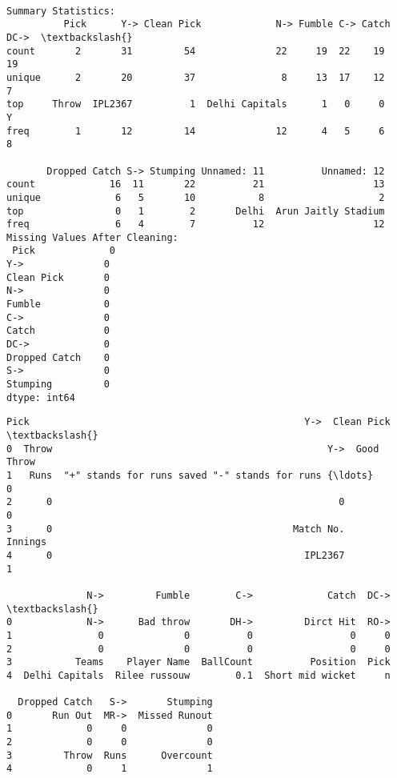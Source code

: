 \documentclass[11pt]{article}
\makeatletter
\newcommand{\boxspacing}{\kern\kvtcb@left@rule\kern\kvtcb@boxsep}
\newcommand{\prompt}[4]{
        {\ttfamily\llap{{\color{#2}[#3]:\hspace{3pt}#4}}\vspace{-\baselineskip}}
    }
\makeatother
\begin{document}
    \begin{Verbatim}[commandchars=\\\{\}]

Summary Statistics:
          Pick      Y-> Clean Pick             N-> Fumble C-> Catch DC->  \textbackslash{}
count       2       31         54              22     19  22    19   19
unique      2       20         37               8     13  17    12    7
top     Throw  IPL2367          1  Delhi Capitals      1   0     0    Y
freq        1       12         14              12      4   5     6    8

       Dropped Catch S-> Stumping Unnamed: 11          Unnamed: 12
count             16  11       22          21                   13
unique             6   5       10           8                    2
top                0   1        2       Delhi  Arun Jaitly Stadium
freq               6   4        7          12                   12
Missing Values After Cleaning:
 Pick             0
Y->              0
Clean Pick       0
N->              0
Fumble           0
C->              0
Catch            0
DC->             0
Dropped Catch    0
S->              0
Stumping         0
dtype: int64
    \end{Verbatim}

            \begin{tcolorbox}[breakable, size=fbox, boxrule=.5pt, pad at break*=1mm, opacityfill=0]
\prompt{Out}{outcolor}{6}{\boxspacing}
\begin{Verbatim}[commandchars=\\\{\}]
    Pick                                                Y->  Clean Pick  \textbackslash{}
0  Throw                                                Y->  Good Throw
1   Runs  "+" stands for runs saved "-" stands for runs {\ldots}           0
2      0                                                  0           0
3      0                                          Match No.     Innings
4      0                                            IPL2367           1

              N->         Fumble        C->             Catch  DC->  \textbackslash{}
0             N->      Bad throw       DH->         Dirct Hit  RO->
1               0              0          0                 0     0
2               0              0          0                 0     0
3           Teams    Player Name  BallCount          Position  Pick
4  Delhi Capitals  Rilee russouw        0.1  Short mid wicket     n

  Dropped Catch   S->       Stumping
0       Run Out  MR->  Missed Runout
1             0     0              0
2             0     0              0
3         Throw  Runs      Overcount
4             0     1              1
\end{Verbatim}
\end{tcolorbox}
        
\end{document}
